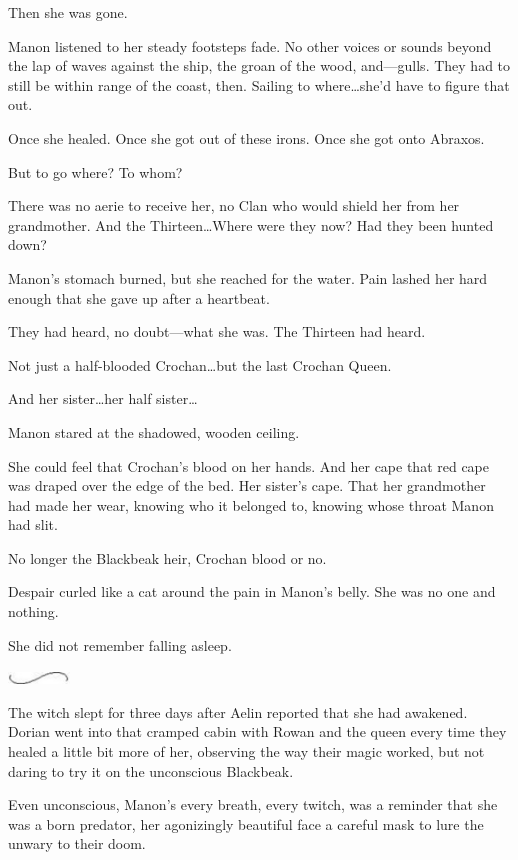 Then she was gone.

Manon listened to her steady footsteps fade.
No other voices or sounds beyond the lap of waves against the ship, the groan of the wood, and---gulls.
They had to still be within range of the coast, then.
Sailing to where\ldots she'd have to figure that out.

Once she healed.
Once she got out of these irons.
Once she got onto Abraxos.

But to go where?
To whom?

There was no aerie to receive her, no Clan who would shield her from her grandmother.
And the Thirteen\ldots Where were they now?
Had they been hunted down?

Manon's stomach burned, but she reached for the water.
Pain lashed her hard enough that she gave up after a heartbeat.

They had heard, no doubt---what she was.
The Thirteen had heard.

Not just a half-blooded Crochan\ldots but the last Crochan Queen.

And her sister\ldots her half sister\ldots{}

Manon stared at the shadowed, wooden ceiling.

She could feel that Crochan's blood on her hands.
And her cape 
that red cape was draped over the edge of the bed.
Her sister's cape.
That her grandmother had made her wear, knowing who it belonged to, knowing whose throat Manon had slit.

No longer the Blackbeak heir, Crochan blood or no.

Despair curled like a cat around the pain in Manon's belly.
She was no one and nothing.

She did not remember falling asleep.

\begin{center}
	\includegraphics[width=0.65in,height=0.13in]{images/seperator}
\end{center}

The witch slept for three days after Aelin reported that she had awakened.
Dorian went into that cramped cabin with Rowan and the queen every time they healed a little bit more of her, observing the way their magic worked, but not daring to try it on the unconscious Blackbeak.

Even unconscious, Manon's every breath, every twitch, was a reminder that she was a born predator, her agonizingly beautiful face a careful mask to lure the unwary to their doom.

